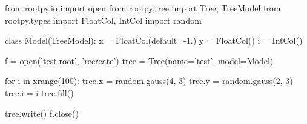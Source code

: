 \begin{footnotesize}
\begin{pyglist}[language=python,texcl=true,style=vs,bgcolor=Moccasin]
from rootpy.io import open
from rootpy.tree import Tree, TreeModel
from rootpy.types import FloatCol, IntCol
import random

class Model(TreeModel):
    x = FloatCol(default=-1.)
    y = FloatCol()
    i = IntCol()

f = open('test.root', 'recreate')
tree = Tree(name='test', model=Model)

for i in xrange(100):
    tree.x = random.gauss(4, 3)
    tree.y = random.gauss(2, 3)
    tree.i = i
    tree.fill()

tree.write()
f.close()
\end{pyglist}
\end{footnotesize}
